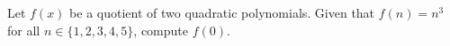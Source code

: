 Let $f(x)$ be a quotient of two quadratic polynomials. Given that $f(n)=n^{3}$ for all $n \in\{1,2,3,4,5\}$, compute $f(0)$.